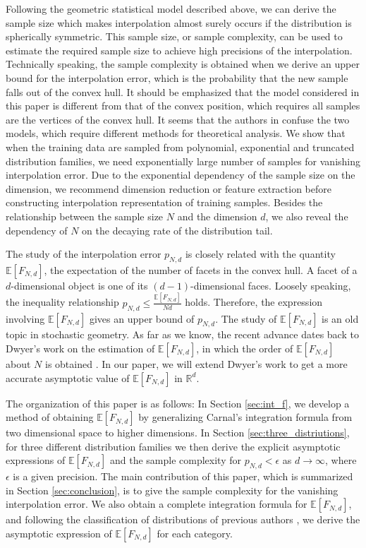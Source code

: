 \documentclass[conference,a4paper]{IEEEtran}
\def\E{\mathbb{E}}
\def\R{\mathbb{R}}
\begin{document}
Following the geometric statistical model described above, we can derive the sample size which makes
interpolation almost surely occurs if the distribution is spherically symmetric.
This sample size, or sample complexity, can be used to estimate the required sample size
to achieve high precisions of the interpolation.
Technically speaking, the sample complexity is obtained when we derive an upper bound for the interpolation error,
which is the probability that the new sample falls out of the convex hull.
It should be emphasized that the model considered in this paper is different from that of the convex position,
which requires all samples are the vertices of the convex hull.
It seems that the authors in \cite{balestriero2021learning} confuse the two models, which require
different methods for theoretical analysis.
We show that when the training data are sampled from polynomial,
exponential and truncated distribution families,
we need exponentially large number of samples for vanishing interpolation error.
Due to the exponential dependency of the sample size on the dimension, we recommend dimension reduction or feature extraction
before constructing interpolation representation of training samples.
Besides the relationship between the sample size $N$ and the dimension $d$,
we also reveal the dependency of $N$ on the decaying rate of the distribution tail.

The study of the interpolation error $p_{N,d}$ is closely related with the quantity $\E[F_{N,d}]$,
the expectation of the number of facets in the convex hull. A facet of a $d$-dimensional object is one of its $(d-1)$-dimensional faces.
Loosely speaking,
the inequality relationship $p_{N,d} \leq \frac{\E[F_{N,d}]}{Nd}$ holds. Therefore, the expression
involving $\E[F_{N,d}]$ gives an upper bound of $p_{N,d}$.
The study of $\E[F_{N,d}]$
is an old topic in stochastic geometry. As far as we know, the recent advance dates back to Dwyer's work on the estimation of $\E[F_{N,d}]$,
in which the order of $\E[F_{N,d}]$ about $N$ is obtained \cite{dwyer1991convex}. In our paper, we will extend Dwyer's work
to get a more accurate asymptotic value of $\E[F_{N,d}]$ in $\R^d$.

The organization of this paper is as follows: In Section \ref{sec:int_f}, we develop a method of obtaining $\E[F_{N,d}]$ by generalizing Carnal's integration formula
from two dimensional space to higher dimensions.
In Section \ref{sec:three_distriutions}, for three different distribution families we then derive the explicit asymptotic
expressions of $\E[F_{N,d}]$ and the sample complexity for $p_{N,d}<\epsilon$ as $d\to\infty$,
where $\epsilon$ is a given precision.
The main contribution of this paper,
which is summarized in Section \ref{sec:conclusion},
is to give the sample complexity for the vanishing interpolation error.
We also obtain a complete integration formula for $\E[F_{N,d}]$,
and following the classification of distributions of previous authors \cite{carnal1970konvexe,dwyer1991convex},
we derive the asymptotic expression
of $\E[F_{N,d}]$ for each category.
\end{document}
